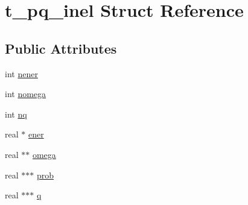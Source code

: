\hypertarget{structt__pq__inel}{\section{t\-\_\-pq\-\_\-inel \-Struct \-Reference}
\label{structt__pq__inel}
}
\subsection*{\-Public \-Attributes}
\begin{DoxyCompactItemize}
\item 
int \hyperlink{structt__pq__inel_a604b5b2b2f927e89ccd5eca907e8e32f}{nener}
\item 
int \hyperlink{structt__pq__inel_a876f9930256fa13f377a6b2e4d4dae6f}{nomega}
\item 
int \hyperlink{structt__pq__inel_a10e7a3ab7fe3370af7ffab08be532696}{nq}
\item 
real $\ast$ \hyperlink{structt__pq__inel_ad8e059e4292b78424ad4dd10c62d2a69}{ener}
\item 
real $\ast$$\ast$ \hyperlink{structt__pq__inel_a9a8b6e9ab72125d659e1201ec06a5724}{omega}
\item 
real $\ast$$\ast$$\ast$ \hyperlink{structt__pq__inel_a7f9d3dfd5e8fc9a0dd0592a59b15b3f5}{prob}
\item 
real $\ast$$\ast$$\ast$ \hyperlink{structt__pq__inel_a5e83ee8a160437288d221cf72ecfa905}{q}
\end{DoxyCompactItemize}


